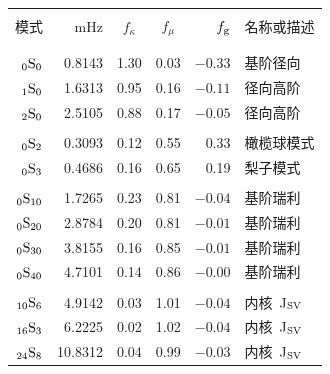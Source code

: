 {\begin{table}
\centering
{}%
%
\begin{tabular}{|r|r|c|c|r|l|} \hline
& & & & & \\
模式 & mHz \hspace{1.3 mm} & $f_{\kappa}$ & $f_{\mu}$
& $f_{\rm g}$\hspace{3.0 mm} & 名称或描述\\
& & & & & \\ \hline
& & & & & \\
${}_0{\rm S}_0$\hspace{1.7 mm} & 0.8143 & 1.30 & 0.03 & $-0.33$ & 基阶径向 \\
${}_1{\rm S}_0$\hspace{1.7 mm} & 1.6313 & 0.95 & 0.16 & $-0.11$ & 径向高阶 \\
${}_2{\rm S}_0$\hspace{1.7 mm} & 2.5105 & 0.88 & 0.17 & $-0.05$ & 径向高阶 \\
& & & & & \\
${}_0{\rm S}_2$\hspace{1.7 mm} & 0.3093 & 0.12 & 0.55 & 0.33 & 橄榄球模式 \\
${}_0{\rm S}_3$\hspace{1.7 mm} & 0.4686 & 0.16 & 0.65 & 0.19 & 梨子模式 \\
& & & & & \\
${}_0{\rm S}_{10}$\hspace{0.4 mm} & 1.7265 & 0.23 & 0.81 & $-0.04$ & 基阶瑞利 \\
${}_0{\rm S}_{20}$\hspace{0.4 mm} & 2.8784 & 0.20 & 0.81 & $-0.01$ & 基阶瑞利 \\
${}_0{\rm S}_{30}$\hspace{0.4 mm} & 3.8155 & 0.16 & 0.85 & $-0.01$ & 基阶瑞利 \\
${}_0{\rm S}_{40}$\hspace{0.4 mm} & 4.7101 & 0.14 & 0.86 & $-0.00$ & 基阶瑞利 \\
& & & & & \\
${}_{10}{\rm S}_6$\hspace{1.7 mm} & 4.9142 & 0.03 & 1.01 & $-0.04$ & 内核~J${}_{\rm SV}$ \\
${}_{16}{\rm S}_3$\hspace{1.7 mm} & 6.2225 & 0.02 & 1.02 & $-0.04$ & 内核~J${}_{\rm SV}$ \\
${}_{24}{\rm S}_8$\hspace{1.7 mm} & 10.8312 & 0.04 & 0.99 & $-0.03$ & 内核~J${}_{\rm SV}$ \\

\end{tabular}
\end{table}}
